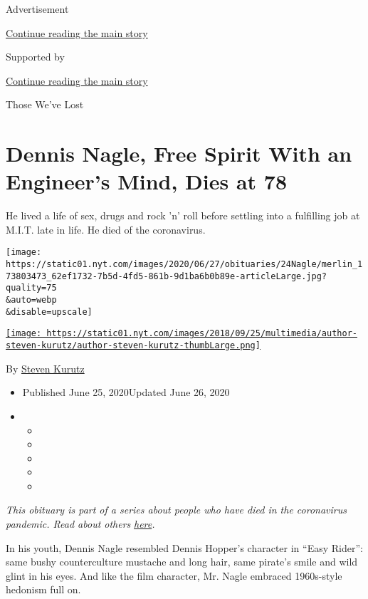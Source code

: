 Advertisement

\protect\hyperlink{after-top}{Continue reading the main story}

Supported by

\protect\hyperlink{after-sponsor}{Continue reading the main story}

Those We've Lost

\hypertarget{dennis-nagle-free-spirit-with-an-engineers-mind-dies-at-78}{%
\section{Dennis Nagle, Free Spirit With an Engineer's Mind, Dies at
78}\label{dennis-nagle-free-spirit-with-an-engineers-mind-dies-at-78}}

He lived a life of sex, drugs and rock 'n' roll before settling into a
fulfilling job at M.I.T. late in life. He died of the coronavirus.

\texttt{[image: https://static01.nyt.com/images/2020/06/27/obituaries/24Nagle/merlin\_173803473\_62ef1732-7b5d-4fd5-861b-9d1ba6b0b89e-articleLarge.jpg?quality=75\\\&auto=webp\\\&disable=upscale]}

\href{https://www.nytimes.com/by/steven-kurutz}{\texttt{[image: https://static01.nyt.com/images/2018/09/25/multimedia/author-steven-kurutz/author-steven-kurutz-thumbLarge.png]}}

By \href{https://www.nytimes.com/by/steven-kurutz}{Steven Kurutz}

\begin{itemize}
\item
  Published June 25, 2020Updated June 26, 2020
\item
  \begin{itemize}
  \item
  \item
  \item
  \item
  \item
  \end{itemize}
\end{itemize}

\emph{This obituary is part of a series about people who have died in
the coronavirus pandemic. Read about others}
\href{https://www.nytimes.com/interactive/2020/obituaries/people-died-coronavirus-obituaries.html}{\emph{here}}\emph{.}

In his youth, Dennis Nagle resembled Dennis Hopper's character in ``Easy
Rider'': same bushy counterculture mustache and long hair, same pirate's
smile and wild glint in his eyes. And like the film character, Mr. Nagle
embraced 1960s-style hedonism full on.

